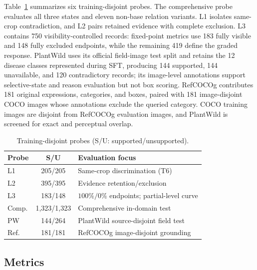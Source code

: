 \documentclass[letterpaper]{article}
\begin{document}
Table~\ref{tab:probes} summarizes six training-disjoint probes. The comprehensive probe evaluates all three states and eleven non-base relation variants. L1 isolates same-crop contradiction, and L2 pairs retained evidence with complete exclusion. L3 contains 750 visibility-controlled records: fixed-point metrics use 183 fully visible and 148 fully excluded endpoints, while the remaining 419 define the graded response. PlantWild \citep{wei2024plantwild} uses its official field-image test split and retains the 12 disease classes represented during SFT, producing 144 supported, 144 unavailable, and 120 contradictory records; its image-level annotations support selective-state and reason evaluation but not box scoring. RefCOCOg \citep{mao2016refcocog} contributes 181 original expressions, categories, and boxes, paired with 181 image-disjoint COCO images whose annotations exclude the queried category. COCO training images are disjoint from RefCOCOg evaluation images, and PlantWild is screened for exact and perceptual overlap.

\begin{table}[t]
\centering
\small
\setlength{\tabcolsep}{0.7mm}
\begin{tabular*}{\columnwidth}{@{\extracolsep{\fill}}lcl@{}}
\toprule
Probe & S/U & Evaluation focus \\
\midrule
L1    & 205/205     & Same-crop discrimination (T6) \\
L2    & 395/395     & Evidence retention/exclusion \\
L3    & 183/148     & $100\%/0\%$ endpoints; partial-level curve \\
Comp. & 1,323/1,323 & Comprehensive in-domain test \\
PW    & 144/264     & PlantWild source-disjoint field test \\
Ref.  & 181/181     & RefCOCOg image-disjoint grounding \\
\bottomrule
\end{tabular*}
\caption{Training-disjoint probes (S/U: supported/unsupported).}
\label{tab:probes}
\end{table}

\subsection{Metrics}
\label{sec:metrics}
\end{document}
